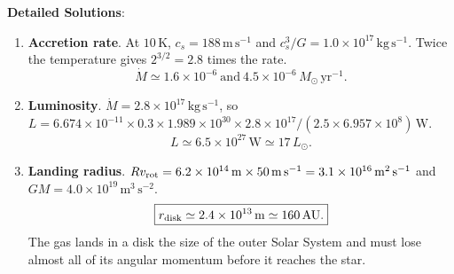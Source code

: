 \textbf{Detailed Solutions}:
\begin{enumerate}[label=(\alph*)]
	\item \textbf{Accretion rate}. At $10\,\mathrm K$, $c_s=188\,\mathrm{m\,s^{-1}}$ and $c_s^3/G=1.0\times10^{17}\,\mathrm{kg\,s^{-1}}$. Twice the temperature gives $2^{3/2}=2.8$ times the rate.
	\[
	\boxed{\dot M\simeq1.6\times10^{-6}\ \text{and}\ 4.5\times10^{-6}\,M_\odot\,\mathrm{yr^{-1}}.}
	\]
	\item \textbf{Luminosity}. $\dot M=2.8\times10^{17}\,\mathrm{kg\,s^{-1}}$, so $L=6.674\times10^{-11}\times0.3\times1.989\times10^{30}\times2.8\times10^{17}/(2.5\times6.957\times10^8)\,\mathrm W$.
	\[
	\boxed{L\simeq6.5\times10^{27}\,\mathrm W\simeq17\,L_\odot.}
	\]
	\item \textbf{Landing radius}. $Rv_{\rm rot}=6.2\times10^{14}\,\mathrm m\times50\,\mathrm{m\,s^{-1}}=3.1\times10^{16}\,\mathrm{m^2\,s^{-1}}$ and $GM=4.0\times10^{19}\,\mathrm{m^3\,s^{-2}}$.
	\[
	\boxed{r_{\rm disk}\simeq2.4\times10^{13}\,\mathrm m\simeq160\,\mathrm{AU}.}
	\]
	The gas lands in a disk the size of the outer Solar System and must lose almost all of its angular momentum before it reaches the star.
\end{enumerate}
